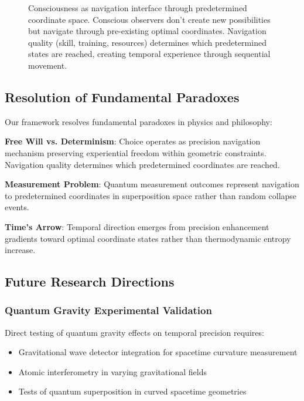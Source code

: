 \documentclass[12pt,a4paper]{article}
\begin{document}
{\begin{figure}[h]
\begin{tikzpicture}[scale=1.0]
\end{tikzpicture}
\caption{Consciousness as navigation interface through predetermined coordinate space. Conscious observers don't create new possibilities but navigate through pre-existing optimal coordinates. Navigation quality (skill, training, resources) determines which predetermined states are reached, creating temporal experience through sequential movement.}
\label{fig:consciousness_navigation}
\end{figure}

\subsection{Resolution of Fundamental Paradoxes}

Our framework resolves fundamental paradoxes in physics and philosophy:

\textbf{Free Will vs. Determinism}: Choice operates as precision navigation mechanism preserving experiential freedom within geometric constraints. Navigation quality determines which predetermined coordinates are reached.

\textbf{Measurement Problem}: Quantum measurement outcomes represent navigation to predetermined coordinates in superposition space rather than random collapse events.

\textbf{Time's Arrow}: Temporal direction emerges from precision enhancement gradients toward optimal coordinate states rather than thermodynamic entropy increase.

\subsection{Future Research Directions}

\subsubsection{Quantum Gravity Experimental Validation}

Direct testing of quantum gravity effects on temporal precision requires:

\begin{itemize}
\item Gravitational wave detector integration for spacetime curvature measurement
\item Atomic interferometry in varying gravitational fields
\item Tests of quantum superposition in curved spacetime geometries
\end{itemize}

}
\end{document}
